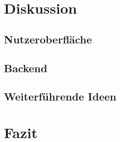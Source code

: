 \documentclass[a4paper]{extarticle}
\begin{document}
    \section{Diskussion}
    \subsection{Nutzeroberfläche}
    \subsection{Backend}
    \subsection{Weiterführende Ideen}

    \section{Fazit}

    
    
    
\end{document}
